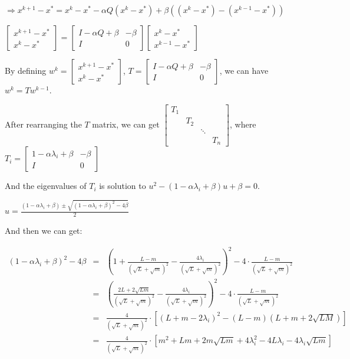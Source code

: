\documentclass[12pt]{article}
\begin{document}
\begin{enumerate}
$\Longrightarrow x^{k+1} - x^* = x^k - x^* - \alpha Q(x^k - x^*) + \beta ( (x^k-x^*) - (x^{k-1}-x^*)) $

$\begin{bmatrix} x^{k+1} - x^* \\ x^k - x^* \end{bmatrix} = \begin{bmatrix} I - \alpha Q + \beta & -\beta \\ I& 0\end{bmatrix}    \begin{bmatrix} x^k - x^* \\ x^{k-1} - x^* \end{bmatrix}$

By defining $w^k = \begin{bmatrix} x^{k+1} - x^* \\ x^k - x^* \end{bmatrix}$, $T = \begin{bmatrix} I - \alpha Q + \beta & -\beta \\ I& 0\end{bmatrix}$, we can have $w^k = T w^{k-1}$.

After rearranging the $T$ matrix, we can get $\begin{bmatrix} T_1  &  & & \\ & T_2 & & \\ & & \ddots & \\ & & & T_n\end{bmatrix}$, where $T_i = \begin{bmatrix} 1 - \alpha \lambda_i + \beta & -\beta \\ I& 0\end{bmatrix}$

And the eigenvalues of $T_i$ is solution to $u^2 - (1 - \alpha \lambda_i + \beta)u + \beta = 0 $.

$u = \frac{(1 - \alpha \lambda_i + \beta) \pm \sqrt{(1 - \alpha \lambda_i + \beta)^2 - 4 \beta}}{2}$

And then we can get:

\noindent$\begin{array}{lll}
(1 - \alpha \lambda_i + \beta)^2 - 4 \beta &=&(1 + \frac{L - m}{(\sqrt{L} + \sqrt{m})^2} - \frac{4\lambda_i}{(\sqrt{L} + \sqrt{m})^2})^2 - 4 \cdot \frac{L-m}{(\sqrt{L} + \sqrt{m})^2}\\
&=& (\frac{2L + 2\sqrt{Lm}}{(\sqrt{L} + \sqrt{m})^2} - \frac{4\lambda_i}{(\sqrt{L} + \sqrt{m})^2})^2 - 4 \cdot \frac{L-m}{(\sqrt{L} + \sqrt{m})^2}\\
&=& \frac{4}{(\sqrt{L} + \sqrt{m})^2} \cdot [(L+m-2\lambda_i)^2 - (L-m)(L+m+2\sqrt{LM})] \\
&=& \frac{4}{(\sqrt{L} + \sqrt{m})^2} \cdot [m^2 + Lm + 2m\sqrt{Lm} + 4\lambda_i^2 - 4L\lambda_i -4\lambda_i\sqrt{Lm}]
\end{array}$


\end{enumerate}
\end{document}
